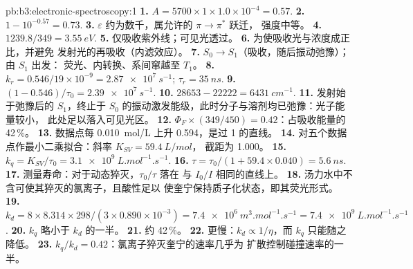 \begin{solution}{pb:b3:electronic-spectroscopy:1}
\textbf{1.} $A = 5700 \times 1 \times 1.0\times10^{-4} = 0.57$.
\textbf{2.} $1 - 10^{-0.57} = 0.73$.
\textbf{3.} $\varepsilon$ 约为数千，属允许的 $\pi\to\pi^*$ 跃迁，
强度中等。
\textbf{4.} $1239.8/349 = \qty{3.55}{eV}$.
\textbf{5.} 仅吸收紫外线；可见光透过。
\textbf{6.} 为使吸收光与浓度成正比，并避免
发射光的再吸收（内滤效应）。
\textbf{7.} $S_0 \to S_1$（吸收，随后振动弛豫）；由 $S_1$ 出发：
荧光、内转换、系间窜越至 $T_1$。
\textbf{8.} $k_r = 0.546/19 \times 10^{-9} = \qty{2.87e7}{s^{-1}}$; $\tau_r = \qty{35}{ns}$.
\textbf{9.} $(1 - 0.546)/\tau_0 = \qty{2.39e7}{s^{-1}}$.
\textbf{10.} $28653 - 22222 = \qty{6431}{cm^{-1}}$.
\textbf{11.} 发射始于弛豫后的 $S_1$，终止于
$S_0$ 的振动激发能级，此时分子与溶剂均已弛豫：光子能量较小，
此处足以落入可见光区。
\textbf{12.} $\Phi_F \times (349/450) = 0.42$：占吸收能量的 42\,\%。
\textbf{13.} 数据点每 \qty{0.010}{mol/L} 上升 0.594，是过 1 的直线。
\textbf{14.} 对五个数据点作最小二乘拟合：斜率 $K_{SV} = \qty{59.4}{L/mol}$，
截距为 1.000。
\textbf{15.} $k_q = K_{SV}/\tau_0 = \qty{3.1e9}{L.mol^{-1}.s^{-1}}$.
\textbf{16.} $\tau = \tau_0/(1 + 59.4 \times 0.040) = \qty{5.6}{ns}$.
\textbf{17.} 测量寿命：对于动态猝灭，$\tau_0/\tau$ 落在
与 $I_0/I$ 相同的直线上。
\textbf{18.} 汤力水中不含可使其猝灭的氯离子，且酸性足以
使奎宁保持质子化状态，即其荧光形式。
\textbf{19.} $k_d = 8 \times 8.314 \times 298/(3 \times 0.890\times10^{-3}) =
\qty{7.4e6}{m^3.mol^{-1}.s^{-1}} = \qty{7.4e9}{L.mol^{-1}.s^{-1}}$.
\textbf{20.} $k_q$ 略小于 $k_d$ 的一半。
\textbf{21.} 约 42\,\%。
\textbf{22.} 更慢：$k_d \propto 1/\eta$，而 $k_q$ 只能随之降低。
\textbf{23.} \textbf{$k_q/k_d = 0.42$}：氯离子猝灭奎宁的速率几乎为
扩散控制碰撞速率的一半。
\end{solution}

